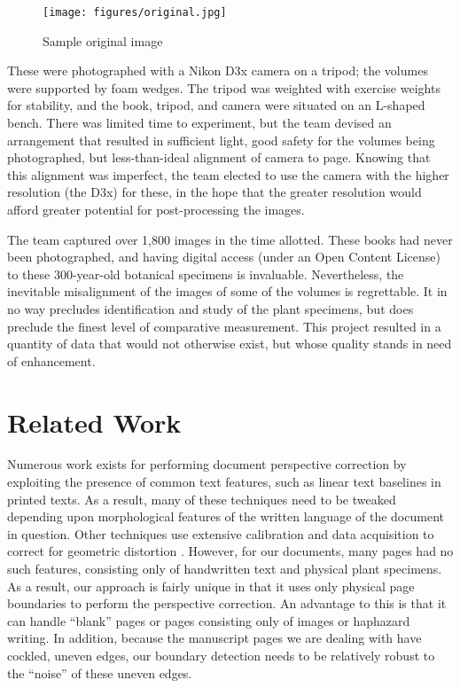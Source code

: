 \documentclass[runningheads,a4paper]{llncs}
\begin{document}
\begin{figure}[!htbm]
  \texttt{[image: figures/original.jpg]}
  \caption{Sample original image}\label{fig:original}
\end{figure}

\clearpage

These were photographed with a Nikon D3x camera on a tripod; the volumes were supported by foam wedges. The tripod was weighted with exercise weights for stability, and the book, tripod, and camera were situated on an L-shaped bench. There was limited time to experiment, but the team devised an arrangement that resulted in sufficient light, good safety for the volumes being photographed, but less-than-ideal alignment of camera to page. Knowing that this alignment was imperfect, the team elected to use the camera with the higher resolution (the D3x) for these, in the hope that the greater resolution would afford greater potential for post-processing the images.

The team captured over 1,800 images in the time allotted. These books had never been photographed, and having digital access (under an Open Content License) to these 300-year-old botanical specimens is invaluable. Nevertheless, the inevitable misalignment of the images of some of the volumes is regrettable. It in no way precludes identification and study of the plant specimens, but does preclude the finest level of comparative measurement. This project resulted in a quantity of data that would not otherwise exist, but whose quality stands in need of enhancement.

\section{Related Work}

Numerous work exists for performing document perspective correction by exploiting the presence of
common text features, such as linear text baselines in printed texts.
As a result, many of these techniques need to be tweaked depending upon morphological features of
the written language of the document in question.
Other techniques use extensive calibration and data acquisition to correct for geometric distortion \cite{Brown:2007ti,LiZhang:2008bp}.
However, for our documents,
many pages had no such features, consisting only of handwritten text and physical plant
specimens. As a result, our approach is fairly unique in that it uses only physical page boundaries to
perform the perspective correction. An advantage to this is that it can handle “blank” pages or pages
consisting only of images or haphazard writing. In addition, because the manuscript pages we are dealing with have
cockled, uneven edges, our boundary detection needs to be relatively robust to the “noise” of these uneven edges.
\end{document}
